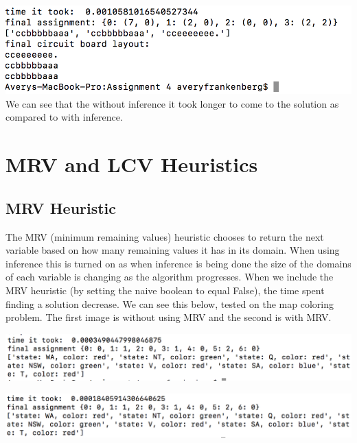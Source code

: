 \documentclass{article}
\begin{document}
\includegraphics[width=\textwidth]{CircuitBoard_withInf.png}
We can see that the without inference it took longer to come to the solution as compared to with inference. 

\section{MRV and LCV Heuristics}
\subsection{MRV Heuristic}
The MRV (minimum remaining values) heuristic chooses to return the next variable based on how many remaining values it has in its domain. When using inference this is turned on as when inference is being done the size of the domains of each variable is changing as the algorithm progresses. When we include the MRV heuristic (by setting the naive boolean to equal False), the time spent finding a solution decrease. We can see this below, tested on the map coloring problem. The first image is without using MRV and the second is with MRV. 

\includegraphics[width=\textwidth]{MapColor_withoutMRV.png}

\includegraphics[width=\textwidth]{MapColor_withMRV.png}
\end{document}
